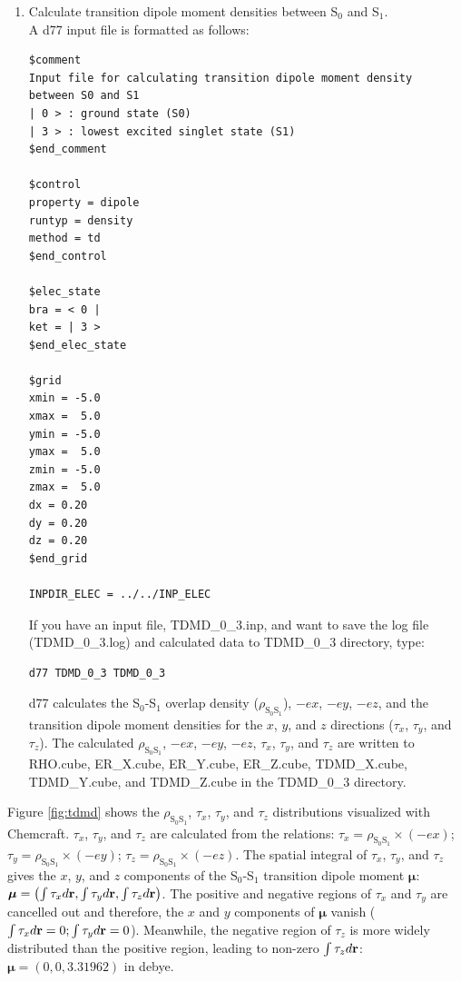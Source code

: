 ﻿\documentclass[11pt,a4paper,openany]{article}
\begin{document}
\begin{enumerate}
\item{
Calculate transition dipole moment densities between S$_0$ and S$_1$.\\
A d77 input file is formatted as follows:
\begin{verbatim}
$comment
Input file for calculating transition dipole moment density
between S0 and S1
| 0 > : ground state (S0)
| 3 > : lowest excited singlet state (S1)
$end_comment

$control
property = dipole
runtyp = density
method = td
$end_control

$elec_state
bra = < 0 |
ket = | 3 >
$end_elec_state

$grid
xmin = -5.0
xmax =  5.0
ymin = -5.0
ymax =  5.0
zmin = -5.0
zmax =  5.0
dx = 0.20
dy = 0.20
dz = 0.20
$end_grid

INPDIR_ELEC = ../../INP_ELEC
\end{verbatim}
If you have an input file, TDMD\_0\_3.inp, and want to save the log file (TDMD\_0\_3.log) and calculated data to TDMD\_0\_3 directory, type:
\begin{verbatim} 
d77 TDMD_0_3 TDMD_0_3
\end{verbatim}
d77 calculates the S$_0$-S$_1$ overlap density ($\rho_{\mathrm{S}_0\mathrm{S}_1}$), 
$-ex$, $-ey$, $-ez$,
and the transition dipole moment densities for the $x$, $y$, and $z$ directions ($\tau_x$, $\tau_y$, and $\tau_z$).
The calculated $\rho_{\mathrm{S}_0\mathrm{S}_1}$, $-ex$, $-ey$, $-ez$, $\tau_x$, $\tau_y$, and $\tau_z$
are written to RHO.cube, ER\_X.cube, ER\_Y.cube, ER\_Z.cube, 
TDMD\_X.cube, TDMD\_Y.cube, and TDMD\_Z.cube
in the TDMD\_0\_3 directory.
}
\end{enumerate}

\indent
Figure \ref{fig:tdmd} shows the $\rho_{\mathrm{S}_0\mathrm{S}_1}$, $\tau_x$, $\tau_y$, and $\tau_z$ distributions visualized with Chemcraft. 
$\tau_x$, $\tau_y$, and $\tau_z$ are calculated from the relations:
$\tau_x = \rho_{\mathrm{S}_0\mathrm{S}_1}\times\left(-ex\right)$; 
$\tau_y = \rho_{\mathrm{S}_0\mathrm{S}_1}\times\left(-ey\right)$;
$\tau_z = \rho_{\mathrm{S}_0\mathrm{S}_1}\times\left(-ez\right)$. 
The spatial integral of $\tau_x$, $\tau_y$, and $\tau_z$ gives the $x$, $y$, and $z$ components of the S$_0$-S$_1$ 
transition dipole moment $\bm{\mu}$: ${\bm{\mu}} = \left(\int \tau_x d{\bf{r}}, \int \tau_y d{\bf{r}}, \int \tau_z d{\bf{r}}\right)$.
The positive and negative regions of $\tau_x$ and $\tau_y$ are cancelled out and therefore, the $x$ and $y$ components of $\bm{\mu}$ vanish ($\int \tau_x d{\bf{r}} = 0; \int \tau_y d{\bf{r}} = 0$). Meanwhile, the negative region of $\tau_z$ is more widely distributed than the positive region, leading to non-zero $\int \tau_z d\bf{r}$:  ${\bm{\mu}} = \left(0, 0, 3.31962\right)$ in debye.\\
\end{document}
